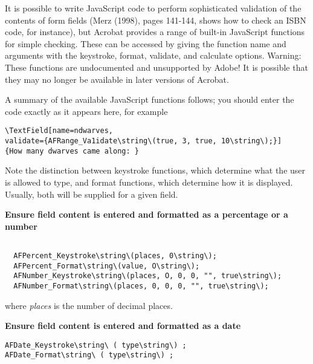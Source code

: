 
It is possible to write JavaScript code to perform sophisticated
validation of the contents of form fields (Merz (1998), pages 141-144,
shows how to check an ISBN code, for instance), but Acrobat provides a
range of built-in JavaScript functions for simple checking. These can be
accessed by giving the function name and arguments with the keystroke,
format, validate, and calculate options. Warning: These functions are
undocumented and unsupported by Adobe! It is possible that they may no
longer be available in later versions of Acrobat. 

A summary of the available JavaScript functions follows; you should enter the 
code exactly as it appears here, for example 

\begin{verbatim}
\TextField[name=ndwarves, 
validate={AFRange_Va1idate\string\(true, 3, true, 10\string\);}] 
{How many dwarves came along: } 
\end{verbatim}

Note the distinction between keystroke functions, which determine what
the user is allowed to type, and format functions, which determine how
it is displayed.  Usually, both will be supplied for a given field. 

\noindent\textbf{Ensure field content is entered and formatted as a percentage or
a number} 

\begin{verbatim}

  AFPercent_Keystroke\string\(places, 0\string\); 
  AFPercent_Format\string\(value, O\string\); 
  AFNumber_Keystroke\string\(places, O, 0, 0, "", true\string\); 
  AFNumber_Format\string\(places, 0, 0, 0, "", true\string\); 

\end{verbatim}

where \emph{places} is the number of decimal places. 

 
 
\noindent\textbf{Ensure field content is entered and formatted as a date} 

\begin{verbatim}
AFDate_Keystroke\string\ ( type\string\) ; 
AFDate_Format\string\ ( type\string\) ; 
\end{verbatim}

